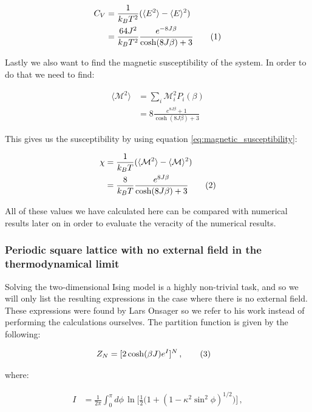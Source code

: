 \documentclass[reprint,english,notitlepage]{revtex4-1}  %
\newcommand\numberthis{\addtocounter{equation}{1}\tag{\theequation}}
\begin{document}
\begin{align*}
C_V &= \frac{1}{k_B T^2} ( \langle E^2 \rangle - \langle E \rangle^2) \\
&= \frac{64J^2}{k_B T^2} \frac{e^{-8J\beta}}{\cosh(8J\beta) + 3} \numberthis \label{eq:2x2_heat_capacity}
\end{align*}

Lastly we also want to find the magnetic susceptibility of the system. In order to do that we need to find:

\begin{align*}
\langle \mathcal{M}^2 \rangle &= \sum\limits_i \mathcal{M}_i^2 P_i(\beta) \\
&= 8 \frac{e^{8J\beta} + 1}{\cosh(8J\beta) + 3}
\end{align*}

This gives us the susceptibility by using equation \eqref{eq:magnetic_susceptibility}:

\begin{align*}
\chi &= \frac{1}{k_B T} ( \langle \mathcal{M}^2 \rangle - \langle \mathcal{M} \rangle^2 ) \\
&= \frac{8}{k_B T} \frac{e^{8J \beta}}{\cosh( 8J \beta) + 3} \numberthis \label{eq:2x2_susceptibility}
\end{align*}

All of these values we have calculated here can be compared with numerical results later on in order to evaluate the veracity of the numerical results.


\subsubsection{Periodic square lattice with no external field in the thermodynamical limit} \label{sec:II:a:ii}

Solving the two-dimensional Ising model is a highly non-trivial task, and so we will only list the resulting expressions in the case where there is no external field. These expressions were found by Lars Onsager so we refer to his work \citep{L.Onsager1944} instead of performing the calculations ourselves. The partition function is given by the following:

\begin{align*}
Z_N &= [2\cosh(\beta J) e^I ]^N \, , \numberthis \label{eq:LO_partition_function}
\end{align*}

where: 

\begin{align*}
I &= \frac{1}{2\pi} \int_0^\pi d\phi \, \ln \bigg[\frac{1}{2}\bigg( 1 + ( 1 - \kappa^2 \sin^2 \phi)^{1/2} \bigg) \bigg] \, , 
\end{align*}
\end{document}
